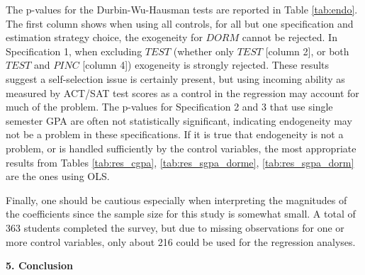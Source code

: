 \documentclass[12pt]{article}
\begin{document}
The p-values for the Durbin-Wu-Hausman tests are reported in Table \ref{tab:endo}.  The first column shows when using all controls, for all but one specification and estimation strategy choice, the exogeneity for $DORM$ cannot be rejected.  In Specification 1, when excluding $TEST$ (whether only $TEST$ [column 2], or both $TEST$ and $PINC$ [column 4]) exogeneity is strongly rejected.  These results suggest a self-selection issue is certainly present, but using incoming ability as measured by ACT/SAT test scores as a control in the regression may account for much of the problem.  The p-values for Specification 2 and 3 that use single semester GPA are often not statistically significant, indicating endogeneity may not be a problem in these specifications.  If it is true that endogeneity is not a problem, or is handled sufficiently by the control variables, the most appropriate results from Tables \ref{tab:res_cgpa}, \ref{tab:res_sgpa_dorme}, \ref{tab:res_sgpa_dorm} are the ones using OLS.

Finally, one should be cautious especially when interpreting the magnitudes of the coefficients since the sample size for this study is somewhat small.  A total of 363 students completed the survey, but due to missing observations for one or more control variables, only about 216 could be used for the regression analyses.  

\begin{center}\textbf{5. Conclusion}\end{center}
\end{document}
